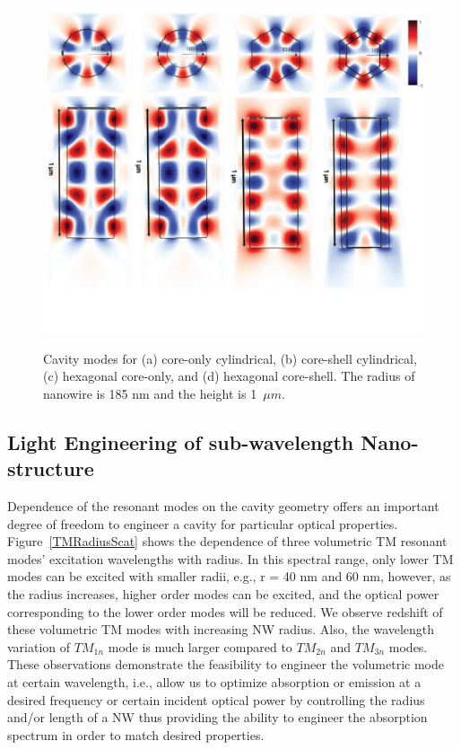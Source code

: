\begin{figure}
  \caption{Cavity modes for (a) core-only cylindrical, (b) core-shell cylindrical, (c) hexagonal core-only, and (d) hexagonal core-shell. The radius of nanowire is 185 nm and the height is 1~$\mu{m}$.}
  \centering
  \includegraphics[width=\textwidth]{pictures/LM/structuredep}
  \label{structuredep}
\end{figure}

\subsection{Light Engineering of sub-wavelength Nano-structure}

Dependence of the resonant modes on the cavity geometry offers an important
degree of freedom to engineer a cavity for particular optical properties.
Figure~\ref{TMRadiusScat} shows the dependence of three volumetric TM resonant
modes’ excitation wavelengths with radius. In this spectral range, only lower
TM modes can be excited with smaller radii, e.g., r = 40 nm and 60 nm, however,
as the radius increases, higher order modes can be excited, and the optical
power corresponding to the lower order modes will be reduced. We observe
redshift of these volumetric TM modes with increasing NW radius. Also, the
wavelength variation of ${TM}_{1n}$ mode is much larger compared to ${TM}_{2n}$
and ${TM}_{3n}$ modes. These observations demonstrate the feasibility to
engineer the volumetric mode at certain wavelength, i.e., allow us to optimize
absorption or emission at a desired frequency or certain incident optical power
by controlling the radius and/or length of a NW thus providing the ability to
engineer the absorption spectrum in order to match desired properties.

